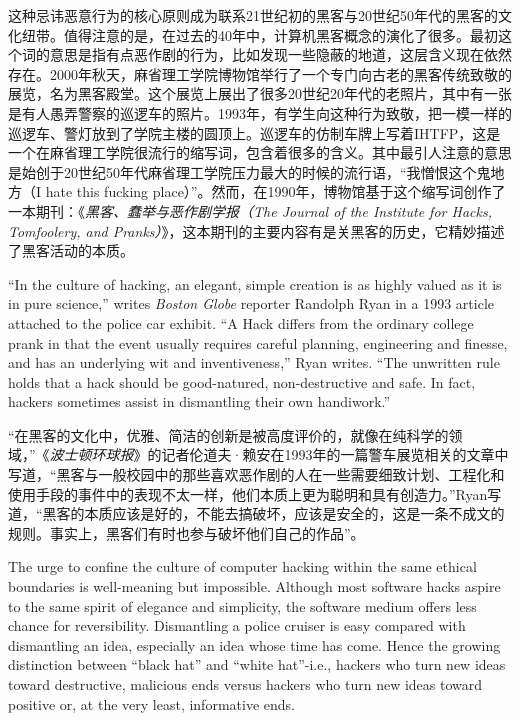 \ifdefined\chs
这种忌讳恶意行为的核心原则成为联系21世纪初的黑客与20世纪50年代的黑客的文化纽带。值得注意的是，在过去的40年中，计算机黑客概念的演化了很多。最初这个词的意思是指有点恶作剧的行为，比如发现一些隐蔽的地道，这层含义现在依然存在。2000年秋天，麻省理工学院博物馆举行了一个专门向古老的黑客传统致敬的展览，名为黑客殿堂。这个展览上展出了很多20世纪20年代的老照片，其中有一张是有人愚弄警察的巡逻车的照片。1993年，有学生向这种行为致敬，把一模一样的巡逻车、警灯放到了学院主楼的圆顶上。巡逻车的仿制车牌上写着IHTFP，这是一个在麻省理工学院很流行的缩写词，包含着很多的含义。其中最引人注意的意思是始创于20世纪50年代麻省理工学院压力最大的时候的流行语，``我憎恨这个鬼地方（I hate this fucking place）''。然而，在1990年，博物馆基于这个缩写词创作了一本期刊：《\textit{黑客、蠢举与恶作剧学报（The Journal of the Institute for Hacks, Tomfoolery, and Pranks）}》，这本期刊的主要内容有是关黑客的历史，它精妙描述了黑客活动的本质。
\fi

\ifdefined\eng
``In the culture of hacking, an elegant, simple creation is as highly valued as it is in pure science,'' writes \textit{Boston Globe} reporter Randolph Ryan in a 1993 article attached to the police car exhibit. ``A Hack differs from the ordinary college prank in that the event usually requires careful planning, engineering and finesse, and has an underlying wit and inventiveness,'' Ryan writes. ``The unwritten rule holds that a hack should be good-natured, non-destructive and safe. In fact, hackers sometimes assist in dismantling their own handiwork.''
\fi

\ifdefined\chs
``在黑客的文化中，优雅、简洁的创新是被高度评价的，就像在纯科学的领域，''《\textit{波士顿环球报}》的记者伦道夫·赖安在1993年的一篇警车展览相关的文章中写道，``黑客与一般校园中的那些喜欢恶作剧的人在一些需要细致计划、工程化和使用手段的事件中的表现不太一样，他们本质上更为聪明和具有创造力。''Ryan写道，``黑客的本质应该是好的，不能去搞破坏，应该是安全的，这是一条不成文的规则。事实上，黑客们有时也参与破坏他们自己的作品''。
\fi

\ifdefined\eng
The urge to confine the culture of computer hacking within the same ethical boundaries is well-meaning but impossible. Although most software hacks aspire to the same spirit of elegance and simplicity, the software medium offers less chance for reversibility. Dismantling a police cruiser is easy compared with dismantling an idea, especially an idea whose time has come. Hence the growing distinction between ``black hat'' and ``white hat''-i.e., hackers who turn new ideas toward destructive, malicious ends versus hackers who turn new ideas toward positive or, at the very least, informative ends.
\fi

